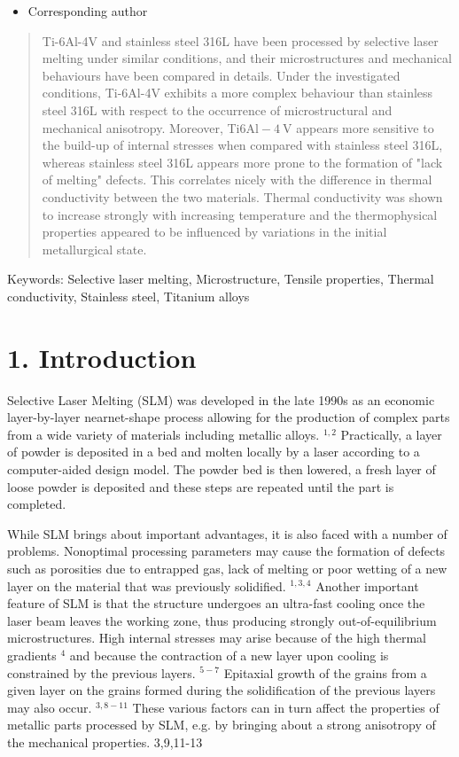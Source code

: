 \documentclass[10pt]{article}
\begin{document}
\begin{itemize}
  \item Corresponding author
\end{itemize}

\begin{abstract}
Ti-6Al-4V and stainless steel 316L have been processed by selective laser melting under similar conditions, and their microstructures and mechanical behaviours have been compared in details. Under the investigated conditions, Ti-6Al-4V exhibits a more complex behaviour than stainless steel 316L with respect to the occurrence of microstructural and mechanical anisotropy. Moreover, Ti$6 \mathrm{Al}-4 \mathrm{~V}$ appears more sensitive to the build-up of internal stresses when compared with stainless steel 316L, whereas stainless steel 316L appears more prone to the formation of "lack of melting" defects. This correlates nicely with the difference in thermal conductivity between the two materials. Thermal conductivity was shown to increase strongly with increasing temperature and the thermophysical properties appeared to be influenced by variations in the initial metallurgical state.
\end{abstract}

Keywords: Selective laser melting, Microstructure, Tensile properties, Thermal conductivity, Stainless steel, Titanium alloys

\section*{1. Introduction}
Selective Laser Melting (SLM) was developed in the late 1990s as an economic layer-by-layer nearnet-shape process allowing for the production of complex parts from a wide variety of materials including metallic alloys. ${ }^{1,2}$ Practically, a layer of powder is deposited in a bed and molten locally by a laser according to a computer-aided design model. The powder bed is then lowered, a fresh layer of loose powder is deposited and these steps are repeated until the part is completed.

While SLM brings about important advantages, it is also faced with a number of problems. Nonoptimal processing parameters may cause the formation of defects such as porosities due to entrapped gas, lack of melting or poor wetting of a new layer on the material that was previously solidified. ${ }^{1,3,4}$ Another important feature of SLM is that the structure undergoes an ultra-fast cooling once the laser beam leaves the working zone, thus producing strongly out-of-equilibrium microstructures. High internal stresses may arise because of the high thermal gradients ${ }^{4}$ and because the contraction of a new layer upon cooling is constrained by the previous layers. ${ }^{5-7}$ Epitaxial growth of the grains from a given layer on the grains formed during the solidification of the previous layers may also occur. ${ }^{3,8-11}$ These various factors can in turn affect the properties of metallic parts processed by SLM, e.g. by bringing about a strong anisotropy of the mechanical properties. 3,9,11-13
\end{document}
